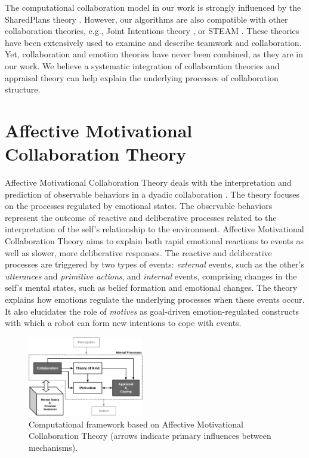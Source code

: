 \documentclass{article}
\begin{document}
The computational collaboration model in our work is strongly influenced by the
SharedPlans theory \cite{grosz:plans-discourse}. However, our algorithms are
also compatible with other collaboration theories, e.g., Joint Intentions theory
\cite{cohen:teamwork}, or STEAM \cite{tambe:flexible-teamwork}. These theories
have been extensively used to examine and describe teamwork and collaboration.
Yet, collaboration and emotion theories have never been combined, as they are in
our work. We believe a systematic integration of collaboration theories and
appraisal theory can help explain the underlying processes of collaboration
structure.

\section{{\fontsize{11.85}{12}\selectfont Affective Motivational Collaboration
Theory}}

Affective Motivational Collaboration Theory deals with the interpretation and
prediction of observable behaviors in a dyadic collaboration
\cite{shayganfar:theory-overview}. The theory focuses on the processes regulated
by emotional states. The observable behaviors represent the outcome of reactive
and deliberative processes related to the interpretation of the self's
relationship to the environment. Affective Motivational Collaboration Theory
aims to explain both rapid emotional reactions to events as well as slower, more
deliberative responses. The reactive and deliberative processes are triggered by
two types of events: \textit{external} events, such as the other's
\textit{utterances} and \textit{primitive actions}, and \textit{internal}
events, comprising changes in the self's mental states, such as belief formation
and emotional changes. The theory explains how emotions regulate the underlying
processes when these events occur. It also elucidates the role of
\textit{motives} as goal-driven emotion-regulated constructs with which a robot
can form new intentions to cope with events.

\vspace*{-3mm}
\begin{figure}[tbh]
  \centering
  \includegraphics[width=0.45\textwidth]{figure/theory-general-croped.pdf}
  \vspace*{-3mm}
  \caption{{\fontsize{9}{9}\selectfont Computational framework based on
  Affective Motivational Collaboration Theory (arrows indicate primary
  influences between mechanisms).}}
  \vspace*{-3mm}
  \label{fig:cpm}
\end{figure}
\end{document}
